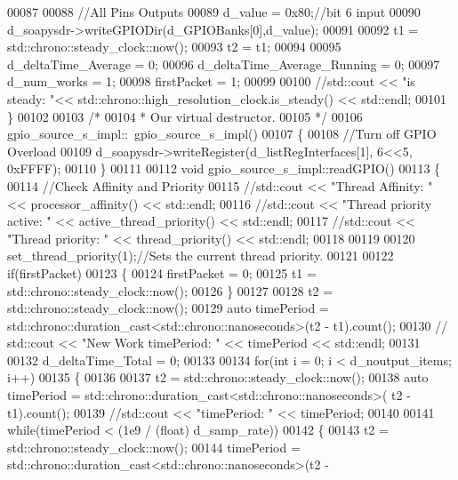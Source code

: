 \begin{DoxyCode}
00087 
00088     \textcolor{comment}{//All Pins Outputs}
00089     d_value = 0x80;\textcolor{comment}{//bit 6 input}
00090     d_soapysdr->writeGPIODir(d_GPIOBanks[0],d_value);
00091 
00092     t1 = std::chrono::steady\_clock::now();
00093     t2 = t1;
00094 
00095     d_deltaTime_Average = 0;
00096     d_deltaTime_Average_Running = 0;
00097     d_num_works = 1;
00098     firstPacket = 1;
00099 
00100     \textcolor{comment}{//std::cout << "is steady: "<< std::chrono::high\_resolution\_clock.is\_steady() << std::endl;}
00101     \}
00102 
00103     \textcolor{comment}{/*}
00104 \textcolor{comment}{     * Our virtual destructor.}
00105 \textcolor{comment}{     */}
00106     gpio_source_s_impl::~gpio_source_s_impl()
00107     \{
00108       \textcolor{comment}{//Turn off GPIO Overload}
00109       d_soapysdr->writeRegister(d_listRegInterfaces[1], 6<<5, 0xFFFF);
00110     \}
00111 
00112     \textcolor{keywordtype}{void} gpio_source_s_impl::readGPIO()
00113     \{
00114       \textcolor{comment}{//Check Affinity and Priority}
00115       \textcolor{comment}{//std::cout << "Thread Affinity: " << processor\_affinity() << std::endl;}
00116       \textcolor{comment}{//std::cout << "Thread priority active: " << active\_thread\_priority() << std::endl;}
00117       \textcolor{comment}{//std::cout << "Thread priority: " << thread\_priority() << std::endl;}
00118 
00119 
00120       set\_thread\_priority(1);\textcolor{comment}{//Sets the current thread priority.}
00121 
00122       \textcolor{keywordflow}{if}(firstPacket)
00123       \{
00124         firstPacket = 0;
00125         t1 = std::chrono::steady\_clock::now();
00126       \}
00127 
00128       t2 = std::chrono::steady\_clock::now();
00129       \textcolor{keyword}{auto} timePeriod = std::chrono::duration\_cast<std::chrono::nanoseconds>(t2 - 
      t1).count();
00130     \textcolor{comment}{//  std::cout << "New Work timePeriod: " << timePeriod << std::endl;}
00131 
00132       d_deltaTime_Total = 0;
00133 
00134       \textcolor{keywordflow}{for}(\textcolor{keywordtype}{int} i = 0; i < d_noutput_items; i++)
00135       \{
00136 
00137         t2 = std::chrono::steady\_clock::now();
00138         \textcolor{keyword}{auto} timePeriod = std::chrono::duration\_cast<std::chrono::nanoseconds>(
      t2 - t1).count();
00139         \textcolor{comment}{//std::cout << "timePeriod: " << timePeriod;}
00140 
00141         \textcolor{keywordflow}{while}(timePeriod < (1e9 / (\textcolor{keywordtype}{float}) d_samp_rate))
00142         \{
00143           t2 = std::chrono::steady\_clock::now();
00144           timePeriod = std::chrono::duration\_cast<std::chrono::nanoseconds>(t2 - 

\end{DoxyCode}
